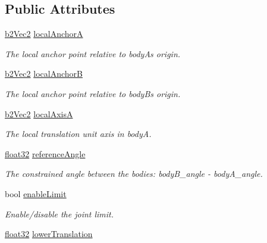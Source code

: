 \subsection*{Public Attributes}
\begin{DoxyCompactItemize}
\item 
\mbox{\hyperlink{structb2_vec2}{b2\+Vec2}} \mbox{\hyperlink{structb2_prismatic_joint_def_abb51df8daff7a55f47adc83e4f7fa5b9}{local\+AnchorA}}
\begin{DoxyCompactList}\small\item\em The local anchor point relative to bodyA\textquotesingle{}s origin. \end{DoxyCompactList}\item 
\mbox{\hyperlink{structb2_vec2}{b2\+Vec2}} \mbox{\hyperlink{structb2_prismatic_joint_def_a5acc1f2f14d1b659fc9d804ab1baf4a3}{local\+AnchorB}}
\begin{DoxyCompactList}\small\item\em The local anchor point relative to bodyB\textquotesingle{}s origin. \end{DoxyCompactList}\item 
\mbox{\hyperlink{structb2_vec2}{b2\+Vec2}} \mbox{\hyperlink{structb2_prismatic_joint_def_af36fdbcedca5a392a2649cd235c42676}{local\+AxisA}}
\begin{DoxyCompactList}\small\item\em The local translation unit axis in bodyA. \end{DoxyCompactList}\item 
\mbox{\hyperlink{b2_settings_8h_aacdc525d6f7bddb3ae95d5c311bd06a1}{float32}} \mbox{\hyperlink{structb2_prismatic_joint_def_aa84b43d08e6e11b4daa0c86f46094463}{reference\+Angle}}
\begin{DoxyCompactList}\small\item\em The constrained angle between the bodies\+: body\+B\+\_\+angle -\/ body\+A\+\_\+angle. \end{DoxyCompactList}\item 
bool \mbox{\hyperlink{structb2_prismatic_joint_def_aa61a03b68caac62a5cf66354f6756eae}{enable\+Limit}}
\begin{DoxyCompactList}\small\item\em Enable/disable the joint limit. \end{DoxyCompactList}\item 
\mbox{\hyperlink{b2_settings_8h_aacdc525d6f7bddb3ae95d5c311bd06a1}{float32}} \mbox{\hyperlink{structb2_prismatic_joint_def_ac0a0e2a669d640ebea354895fe6a9fb6}{lower\+Translation}}

\end{DoxyCompactItemize}

